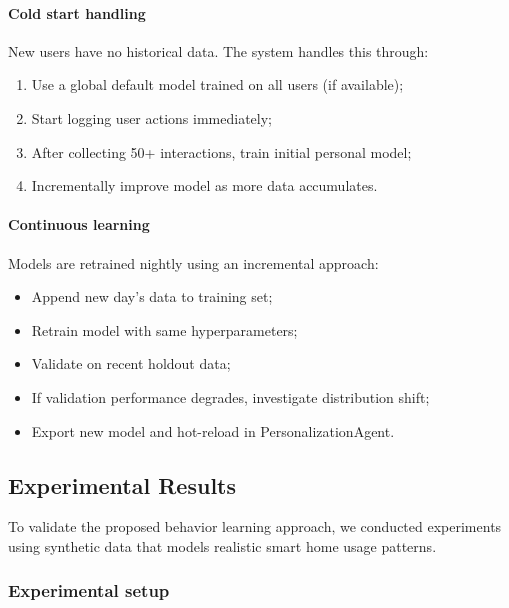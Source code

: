 \paragraph{Cold start handling}
New users have no historical data. The system handles this through:
\begin{enumerate}
    \item Use a global default model trained on all users (if available);
    \item Start logging user actions immediately;
    \item After collecting 50+ interactions, train initial personal model;
    \item Incrementally improve model as more data accumulates.
\end{enumerate}

\paragraph{Continuous learning}
Models are retrained nightly using an incremental approach:
\begin{itemize}
    \item Append new day's data to training set;
    \item Retrain model with same hyperparameters;
    \item Validate on recent holdout data;
    \item If validation performance degrades, investigate distribution shift;
    \item Export new model and hot-reload in PersonalizationAgent.
\end{itemize}

\subsection{Experimental Results}
\label{sec:experimental-results}

To validate the proposed behavior learning approach, we conducted experiments
using synthetic data that models realistic smart home usage patterns.

\subsubsection{Experimental setup}

